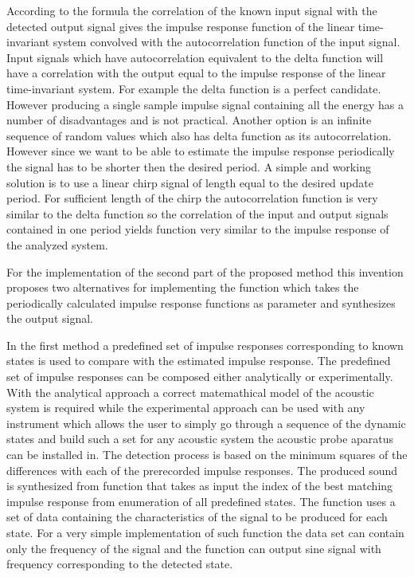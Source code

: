 \pa
According to the formula the correlation of the known input signal with the detected output signal gives the impulse response function of the linear time-invariant system convolved with the autocorrelation function of the input signal. Input signals which have autocorrelation equivalent to the delta function will have a correlation with the output equal to the impulse response of the linear time-invariant system. For example the delta function is a perfect candidate. However producing a single sample impulse signal containing all the energy has a number of disadvantages and is not practical. Another option is an infinite sequence of random values which also has delta function as its autocorrelation. However since we want to be able to estimate the impulse response periodically the signal has to be shorter then the desired period. A simple and working solution is to use a linear chirp signal of length equal to the desired update period. For sufficient length of the chirp the autocorrelation function is very similar to the delta function so the correlation of the input and output signals contained in one period yields function very similar to the impulse response of the analyzed system.

\pa
For the implementation of the second part of the proposed method this invention proposes two alternatives for implementing the function which takes the periodically calculated impulse response functions as parameter and synthesizes the output signal.

\pa
In the first method a predefined set of impulse responses corresponding to known states is used to compare with the estimated impulse response. The predefined set of impulse responses can be composed either analytically or experimentally. With the analytical approach a correct matemathical model of the acoustic system is required while the experimental approach can be used with any instrument which allows the user to simply go through a sequence of the dynamic states and build such a set for any acoustic system the acoustic probe aparatus can be installed in. The detection process is based on the minimum squares of the differences with each of the prerecorded impulse responses. The produced sound is synthesized from function that takes as input the index of the best matching impulse response from enumeration of all predefined states. The function uses a set of data containing the characteristics of the signal to be produced for each state. For a very simple implementation of such function the data set can contain only the frequency of the signal and the function can output sine signal with frequency corresponding to the detected state.

